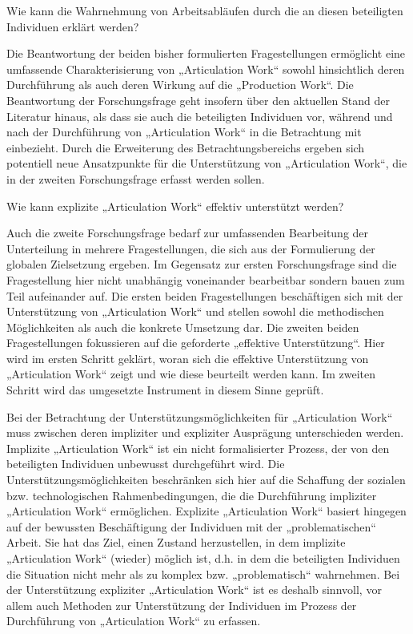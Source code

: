 \begin{tf}
	\label{tf:rolle_der_individuen}
	Wie kann die Wahrnehmung von Arbeitsabläufen durch die an diesen beteiligten Individuen erklärt werden?
\end{tf}

Die Beantwortung der beiden bisher formulierten Fragestellungen ermöglicht eine umfassende Charakterisierung von „Articulation Work“ sowohl hinsichtlich deren Durchführung als auch deren Wirkung auf die „Production Work“. Die Beantwortung der Forschungsfrage geht insofern über den aktuellen Stand der Literatur hinaus, als dass sie auch die beteiligten Individuen vor, während und nach der Durchführung von „Articulation Work“ in die Betrachtung mit einbezieht. Durch die Erweiterung des Betrachtungsbereichs ergeben sich potentiell neue Ansatzpunkte für die Unterstützung von „Articulation Work“, die in der zweiten Forschungsfrage erfasst werden sollen.

\begin{ff}
	\label{ff:umsetzung}
	Wie kann explizite „Articulation Work“ effektiv unterstützt werden?
\end{ff}

Auch die zweite Forschungsfrage bedarf zur umfassenden Bearbeitung der Unterteilung in mehrere Fragestellungen, die sich aus der Formulierung der globalen Zielsetzung ergeben. Im Gegensatz zur ersten Forschungsfrage sind die Fragestellung hier nicht unabhängig voneinander bearbeitbar sondern bauen zum Teil aufeinander auf. Die ersten beiden Fragestellungen beschäftigen sich mit der Unterstützung von „Articulation Work“ und stellen sowohl die methodischen Möglichkeiten als auch die konkrete Umsetzung dar. Die zweiten beiden Fragestellungen fokussieren auf die geforderte „effektive Unterstützung“. Hier wird im ersten Schritt geklärt, woran sich die effektive Unterstützung von „Articulation Work“ zeigt und wie diese beurteilt werden kann. Im zweiten Schritt wird das umgesetzte Instrument in diesem Sinne geprüft. 

Bei der Betrachtung der Unterstützungsmöglichkeiten für „Articulation Work“ muss zwischen deren impliziter und expliziter Ausprägung unterschieden werden. Implizite „Articulation Work“ ist ein nicht formalisierter Prozess, der von den beteiligten Individuen unbewusst durchgeführt wird. Die Unterstützungsmöglichkeiten beschränken sich hier auf die Schaffung der sozialen bzw. technologischen Rahmenbedingungen, die die Durchführung impliziter „Articulation Work“ ermöglichen. Explizite „Articulation Work“ basiert hingegen auf der bewussten Beschäftigung der Individuen mit der „problematischen“ Arbeit. Sie hat das Ziel, einen Zustand herzustellen, in dem implizite „Articulation Work“ (wieder) möglich ist, d.h. in dem die beteiligten Individuen die Situation nicht mehr als zu komplex bzw. „problematisch“ wahrnehmen. Bei der Unterstützung expliziter „Articulation Work“ ist es deshalb sinnvoll, vor allem auch Methoden zur Unterstützung der Individuen im Prozess der Durchführung von „Articulation Work“ zu erfassen.


